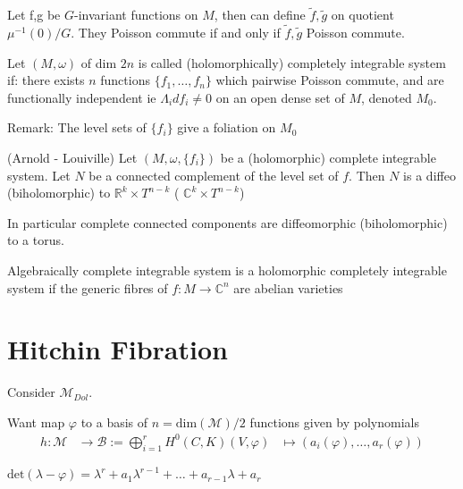Let f,g be $G$-invariant functions on $M$, then can define $\tilde{f}, \tilde{g}$ on quotient $\mu^{-1} (0)/ G $. 
They Poisson commute if and only if  $\tilde{f}, \tilde{g} $ Poisson commute. 

\begin{definition}
    Let $(M, \omega) $ of dim $2n$ is called (holomorphically) completely integrable system if:
    there exists $n$ functions $\{f_1, \dots, f_n \}$ which pairwise Poisson commute, 
    and are functionally independent ie $\Lambda_i df_i \neq 0 $ on an open dense set of $M$, denoted $M_0$. 
\end{definition}

Remark: 
The level sets of $\{f_i \} $ give a foliation on $M_0$ 

\begin{theorem}
    (Arnold - Louiville) 
    Let $(M, \omega, \{f_i \} ) $ be a (holomorphic) complete integrable system. 
    Let $N$ be a connected complement of the level set of $f$. 
    Then $ N$ is a diffeo (biholomorphic) to $ \mathbb{R} ^k \times T^{n-k} $ ( $ \mathbb{C} ^k \times T^{n-k} $) 

    In particular complete connected components are diffeomorphic (biholomorphic) to a torus. 
\end{theorem}

\begin{definition}
Algebraically complete integrable system is a holomorphic completely integrable system if the generic fibres of $f:M \rightarrow \mathbb{C} ^n $ are abelian varieties 
\end{definition}


\section{Hitchin Fibration} %

Consider $\mathcal{M}_{Dol} $. 

Want map $\varphi$ to a basis of $n = \mathrm{dim} (\mathcal{M}) /2 $ 
functions given by polynomials 
\begin{align}
    h: \mathcal{M} & \rightarrow  \mathcal{B} := \bigoplus _{i =1} ^r H^0 ( C, K ) 
    ( V, \varphi ) & \mapsto ( a_i (\varphi), \dots , a_r (\varphi) )
\end{align}

$\mathrm{det} ( \lambda - \varphi) = \lambda ^r  + a_1 \lambda^{r-1} +\dots + a_{r-1} \lambda + a_r $

